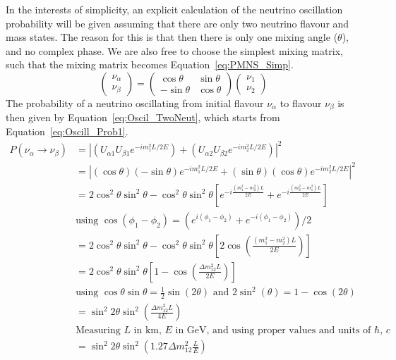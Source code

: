 In the interests of simplicity, an explicit calculation of the neutrino oscillation probability will be given assuming that there are only two neutrino flavour and mass states. The reason for this is that then there is only one mixing angle ($\theta$), and no complex phase. We are also free to choose the simplest mixing matrix, such that the mixing matrix becomes Equation~\ref{eq:PMNS_Simp}.
\begin{equation}
  \label{eq:PMNS_Simp}
  \begin{pmatrix} \nu_{\alpha} \\ \nu_{\beta} \end{pmatrix} = \begin{pmatrix} \cos\theta & \sin\theta \\ -\sin\theta & \cos\theta \end{pmatrix} \begin{pmatrix} \nu_1 \\ \nu_2 \end{pmatrix}
\end{equation}
The probability of a neutrino oscillating from initial flavour $\nu_{\alpha}$ to flavour $\nu_{\beta}$ is then given by Equation~\ref{eq:Oscil_TwoNeut}, which starts from Equation~\ref{eq:Oscill_Prob1}.
\begin{align}
  P(\nu_{\alpha}\rightarrow\nu_{\beta}) &= \left|(U_{\alpha 1}U_{\beta 1}e^{-im_{1}^{2}L/2E}) + (U_{\alpha 2}U_{\beta 2}e^{-im_{2}^{2}L/2E})\right|^2 \nonumber \\
  &= \left|(\cos\theta)(-\sin\theta)e^{-im_{1}^{2}L/2E} + (\sin\theta)(\cos\theta)e^{-im_{2}^{2}L/2E}\right|^2 \nonumber \\
  &= 2\cos^{2}\theta\sin^{2}\theta - \cos^{2}\theta\sin^{2}\theta\left[ e^{-i\frac{(m^{2}_{1}-m^{2}_{2})L}{2E}} + e^{-i\frac{(m^{2}_{2}-m^{2}_{1})L}{2E}} \right] \nonumber\\ 
  &\text{using $\cos\left(\phi_1 - \phi_2\right) = \left(e^{i(\phi_1-\phi_2)} + e^{-i(\phi_1-\phi_2)}\right)/2$} \nonumber \\
  &= 2\cos^{2}\theta\sin^{2}\theta - \cos^{2}\theta\sin^{2}\theta\left[ 2\cos\left(\frac{(m^{2}_{1}-m^{2}_{2})L}{2E} \right) \right] \nonumber \\
  &= 2\cos^{2}\theta\sin^{2}\theta \left[1 - \cos\left(\frac{\Delta m^{2}_{12}L}{2E}\right) \right] \nonumber \\
  &\text{using $\cos\theta\sin\theta = \frac{1}{2}\sin(2\theta)$ and $2\sin^{2}(\theta) = 1 - \cos(2\theta)$} \nonumber \\
  &= \sin^{2}2\theta \sin^{2}\left(\frac{\Delta m^{2}_{12}L}{4E}\right) \label{eq:Oscil_TwoNeut} \\
  &\text{Measuring $L$ in km, $E$ in GeV, and using proper values and units of $\hbar$, $c$} \nonumber \\
  &= \sin^{2}2\theta \sin^{2}\left(1.27\Delta m^{2}_{12}\frac{L}{E}\right) \label{eq:Oscil_Normalised}
\end{align}
